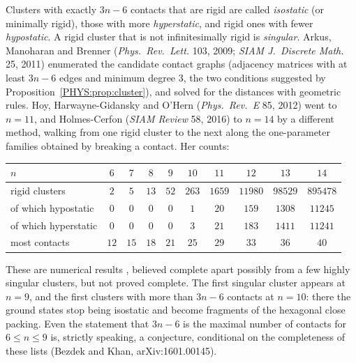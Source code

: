 Clusters with exactly $3n-6$ contacts that are rigid are called \emph{isostatic} (or minimally rigid),
those with more \emph{hyperstatic}, and rigid ones with fewer \emph{hypostatic}. A rigid cluster that is
not infinitesimally rigid is \emph{singular}. Arkus, Manoharan and Brenner (\emph{Phys.\ Rev.\ Lett.} 103, 2009;
\emph{SIAM J.\ Discrete Math.} 25, 2011) enumerated the candidate contact graphs (adjacency matrices with
at least $3n-6$ edges and minimum degree $3$, the two conditions suggested by Proposition~\ref{PHYS:prop:cluster}), and
solved for the distances with geometric rules. Hoy, Harwayne-Gidansky and O'Hern (\emph{Phys.\ Rev.~E} 85,
2012) went to $n=11$, and Holmes-Cerfon (\emph{SIAM Review} 58, 2016) to $n=14$ by a different method,
walking from one rigid cluster to the next along the one-parameter families obtained by breaking a
contact. Her counts:
\begin{center}
\small
\renewcommand{\arraystretch}{1.12}
\begin{tabular}{lccccccccc}
\toprule
$n$ & $6$ & $7$ & $8$ & $9$ & $10$ & $11$ & $12$ & $13$ & $14$\\
\midrule
rigid clusters & $2$ & $5$ & $13$ & $52$ & $263$ & $1659$ & $11980$ & $98529$ & $895478$\\
of which hypostatic & $0$ & $0$ & $0$ & $0$ & $1$ & $20$ & $159$ & $1308$ & $11245$\\
of which hyperstatic & $0$ & $0$ & $0$ & $0$ & $3$ & $21$ & $183$ & $1411$ & $11241$\\
most contacts & $12$ & $15$ & $18$ & $21$ & $25$ & $29$ & $33$ & $36$ & $40$\\
\bottomrule
\end{tabular}
\end{center}
These are numerical results , believed complete apart possibly from a few highly
singular clusters, but not proved complete. The first singular cluster appears at $n=9$, and the first
clusters with more than $3n-6$ contacts at $n=10$: there the ground states stop being isostatic and become
fragments of the hexagonal close packing. Even the statement that $3n-6$ is the maximal number of
contacts for $6\le n\le9$ is, strictly speaking, a conjecture, conditional on the completeness of these
lists (Bezdek and Khan, arXiv:1601.00145).

